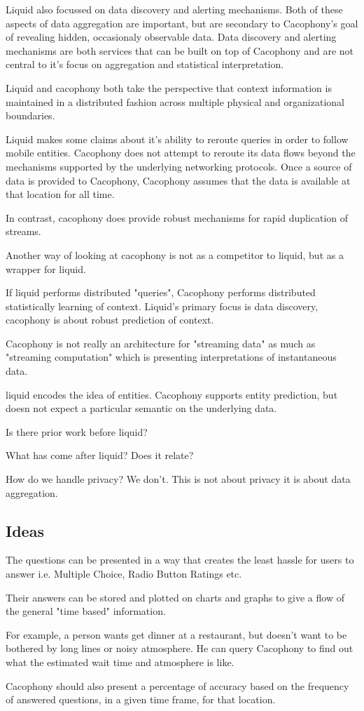 Liquid also focussed on data discovery and alerting mechanisms.  Both of these
aspects of data aggregation are important, but are secondary to Cacophony's goal
of revealing hidden, occasionaly observable data.  Data discovery and alerting
mechanisms are both services that can be built on top of Cacophony and are not
central to it's focus on aggregation and statistical interpretation. 

Liquid and cacophony both take the perspective that context information is
maintained in a distributed fashion across multiple physical and organizational
boundaries.

Liquid makes some claims about it's ability to reroute queries in order to
follow mobile entities.  Cacophony does not attempt to reroute its data flows
beyond the mechanisms supported by the underlying networking protocols.  Once a
source of data is provided to Cacophony, Cacophony assumes that the data is
available at that location for all time.

In contrast, cacophony does provide robust mechanisms for rapid duplication of
streams.  

Another way of looking at cacophony is not as a competitor to liquid, but as a
wrapper for liquid. 

If liquid performs distributed "queries", Cacophony performs distributed
statistically learning of context.  Liquid's primary focus is data discovery,
cacophony is about robust prediction of context.

Cacophony is not really an architecture for "streaming data" as much as
"streaming computation" which is presenting interpretations of instantaneous
data.

liquid encodes the idea of entities.  Cacophony supports entity prediction, but
doesn not expect a particular semantic on the underlying data.



Is there prior work before liquid?

What has come after liquid?  Does it relate?
\cite{Hong2004}


How do we handle privacy? We don't.  This is not about privacy it is about data
aggregation.  



\subsection{Ideas}

The questions can be presented in a way that creates the least hassle for users
to answer i.e. Multiple Choice, Radio Button Ratings etc.

Their answers can be
stored and plotted on charts and graphs to give a flow of the general "time
based" information. 

For
example, a person wants get dinner at a restaurant, but doesn't want to be
bothered by long lines or noisy atmosphere. He can query Cacophony to find out
what the estimated wait time and atmosphere is like. 

Cacophony should also
present a percentage of accuracy based on the frequency of answered questions,
in a given time frame, for that location.


